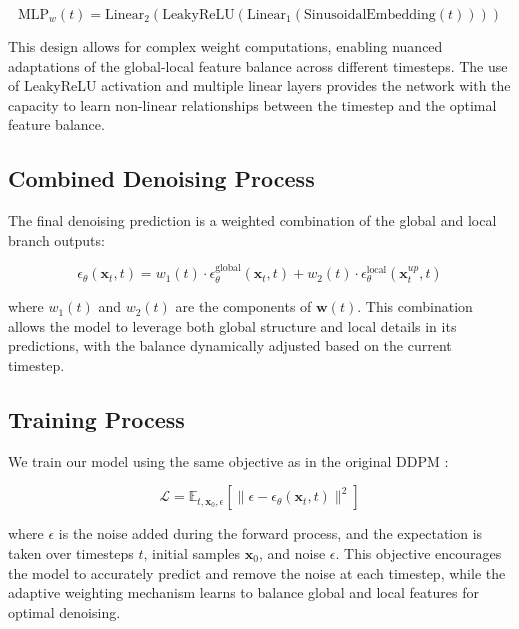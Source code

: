 \documentclass{article} %
\begin{document}
\begin{equation}
    \text{MLP}_w(t) = \text{Linear}_2(\text{LeakyReLU}(\text{Linear}_1(\text{SinusoidalEmbedding}(t))))
\end{equation}

This design allows for complex weight computations, enabling nuanced adaptations of the global-local feature balance across different timesteps. The use of LeakyReLU activation and multiple linear layers provides the network with the capacity to learn non-linear relationships between the timestep and the optimal feature balance.

\subsection{Combined Denoising Process}
The final denoising prediction is a weighted combination of the global and local branch outputs:

\begin{equation}
    \epsilon_\theta(\mathbf{x}_t, t) = w_1(t) \cdot \epsilon_\theta^{\text{global}}(\mathbf{x}_t, t) + w_2(t) \cdot \epsilon_\theta^{\text{local}}(\mathbf{x}_t^{up}, t)
\end{equation}

where $w_1(t)$ and $w_2(t)$ are the components of $\mathbf{w}(t)$. This combination allows the model to leverage both global structure and local details in its predictions, with the balance dynamically adjusted based on the current timestep.

\subsection{Training Process}
We train our model using the same objective as in the original DDPM \cite{ddpm}:

\begin{equation}
    \mathcal{L} = \mathbb{E}_{t, \mathbf{x}_0, \epsilon}\left[\|\epsilon - \epsilon_\theta(\mathbf{x}_t, t)\|^2\right]
\end{equation}

where $\epsilon$ is the noise added during the forward process, and the expectation is taken over timesteps $t$, initial samples $\mathbf{x}_0$, and noise $\epsilon$. This objective encourages the model to accurately predict and remove the noise at each timestep, while the adaptive weighting mechanism learns to balance global and local features for optimal denoising.
\end{document}
